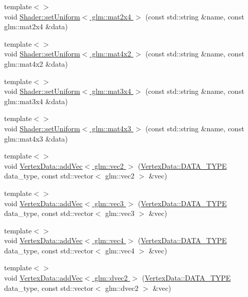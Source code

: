 \begin{DoxyCompactItemize}
{\footnotesize template$<$$>$ }\\void \hyperlink{namespace_graphics_a851e410c469dd50236635961129f1fe4}{Shader\+::set\+Uniform$<$ glm\+::mat2x4 $>$} (const std\+::string \&name, const glm\+::mat2x4 \&data)
\item 
{\footnotesize template$<$$>$ }\\void \hyperlink{namespace_graphics_aa3b2c82914230d2dbdfadd65c5d7868c}{Shader\+::set\+Uniform$<$ glm\+::mat4x2 $>$} (const std\+::string \&name, const glm\+::mat4x2 \&data)
\item 
{\footnotesize template$<$$>$ }\\void \hyperlink{namespace_graphics_aef1271c06e280a7e49a6047768dfa8cf}{Shader\+::set\+Uniform$<$ glm\+::mat3x4 $>$} (const std\+::string \&name, const glm\+::mat3x4 \&data)
\item 
{\footnotesize template$<$$>$ }\\void \hyperlink{namespace_graphics_acb38f27a0c7604ee6c2aff30e8ac0af4}{Shader\+::set\+Uniform$<$ glm\+::mat4x3 $>$} (const std\+::string \&name, const glm\+::mat4x3 \&data)
\item 
{\footnotesize template$<$$>$ }\\void \hyperlink{namespace_graphics_a0b86c5945c56648758211fda30968b2e}{Vertex\+Data\+::add\+Vec$<$ glm\+::vec2 $>$} (\hyperlink{class_graphics_1_1_vertex_data_a50e88236939dc2a3ec4df7aeb728620e}{Vertex\+Data\+::\+D\+A\+T\+A\+\_\+\+T\+Y\+P\+E} data\+\_\+type, const std\+::vector$<$ glm\+::vec2 $>$ \&vec)
\item 
{\footnotesize template$<$$>$ }\\void \hyperlink{namespace_graphics_a8956dc0cb691a72b51183671afc823e4}{Vertex\+Data\+::add\+Vec$<$ glm\+::vec3 $>$} (\hyperlink{class_graphics_1_1_vertex_data_a50e88236939dc2a3ec4df7aeb728620e}{Vertex\+Data\+::\+D\+A\+T\+A\+\_\+\+T\+Y\+P\+E} data\+\_\+type, const std\+::vector$<$ glm\+::vec3 $>$ \&vec)
\item 
{\footnotesize template$<$$>$ }\\void \hyperlink{namespace_graphics_a44d4cb98e2159aabbf6a2745c4d1d70c}{Vertex\+Data\+::add\+Vec$<$ glm\+::vec4 $>$} (\hyperlink{class_graphics_1_1_vertex_data_a50e88236939dc2a3ec4df7aeb728620e}{Vertex\+Data\+::\+D\+A\+T\+A\+\_\+\+T\+Y\+P\+E} data\+\_\+type, const std\+::vector$<$ glm\+::vec4 $>$ \&vec)
\item 
{\footnotesize template$<$$>$ }\\void \hyperlink{namespace_graphics_aafa0ab9cb29bd02627c38261f9616815}{Vertex\+Data\+::add\+Vec$<$ glm\+::dvec2 $>$} (\hyperlink{class_graphics_1_1_vertex_data_a50e88236939dc2a3ec4df7aeb728620e}{Vertex\+Data\+::\+D\+A\+T\+A\+\_\+\+T\+Y\+P\+E} data\+\_\+type, const std\+::vector$<$ glm\+::dvec2 $>$ \&vec)

\end{DoxyCompactItemize}
